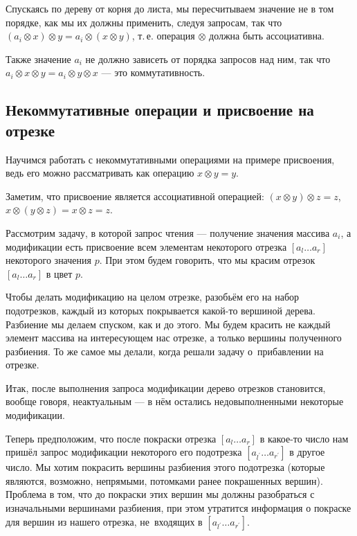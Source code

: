 Спускаясь по дереву от корня до листа, мы пересчитываем значение не в том порядке, как мы их должны применить, следуя запросам, так что $(a_i \otimes x) \otimes y = a_i \otimes (x \otimes y)$, т.\,е. операция $\otimes$ должна быть ассоциативна.

Также значение $a_i$ не должно зависеть от порядка запросов над ним, так что $a_i \otimes x \otimes y = a_i \otimes y \otimes x$ --- это коммутативность.

\subsection{Некоммутативные операции и присвоение на отрезке}

Научимся работать с некоммутативными операциями на примере присвоения, ведь его можно рассматривать как операцию $x \otimes y = y$.

\begin{remark}
    Заметим, что присвоение является ассоциативной операцией: $(x \otimes y) \otimes z = z$, $x \otimes (y \otimes z) = x \otimes z = z$.
\end{remark}

Рассмотрим задачу, в которой запрос чтения --- получение значения массива $a_i$, а модификации есть присвоение всем элементам некоторого отрезка $[a_l\ldots a_r]$ некоторого значения $p$. При этом будем говорить, что мы красим отрезок $[a_l\ldots a_r]$ в цвет $p$.

Чтобы делать модификацию на целом отрезке, разобьём его на набор подотрезков, каждый из которых покрывается какой-то вершиной \mbox{дерева}. Разбиение мы делаем спуском, как и до этого. Мы будем \mbox{красить} не \mbox{каждый} элемент массива на интересующем нас отрезке, а только \mbox{вершины} полученного разбиения. То же самое мы делали, когда решали задачу о~прибавлении на отрезке.

Итак, после выполнения запроса модификации дерево отрезков становится, вообще говоря, неактуальным --- в нём остались недовыполненными некоторые модификации.

Теперь предположим, что после покраски отрезка $[a_l\ldots a_r]$ в какое-то число нам пришёл запрос модификации некоторого его подотрезка $[a_{l^\prime}\ldots a_{r^\prime}]$ в другое число. Мы хотим покрасить вершины \mbox{разбиения} \mbox{этого} подотрезка (которые являются, возможно, непрямыми, потомками \mbox{ранее} покрашенных вершин). Проблема в том, что до покраски этих вершин мы должны разобраться с изначальными вершинами разбиения, при этом утратится информация о покраске для вершин из нашего отрезка, не~входящих в $[a_{l^\prime}\ldots a_{r^\prime}]$.

